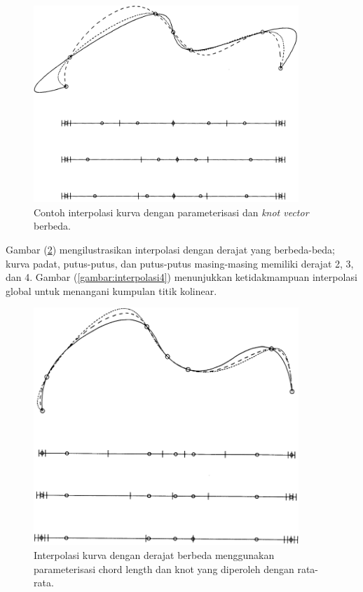 \begin{figure}[H]
	\centering
	\includegraphics[keepaspectratio, width=10cm]{gambar/Interpolasi/pic7.png}
	\caption{Contoh interpolasi kurva dengan 
	parameterisasi dan \textit{knot vector}  berbeda.}
	\label{gambar:interpolasi2}
\end{figure}

Gambar (\ref{gambar:interpolasi3}) mengilustrasikan 
interpolasi dengan derajat yang berbeda-beda; 
kurva padat, putus-putus, dan putus-putus 
masing-masing memiliki derajat 2, 3, dan 4. 
Gambar (\ref{gambar:interpolasi4}) menunjukkan 
ketidakmampuan interpolasi global untuk menangani 
kumpulan titik kolinear.

\begin{figure}[H]
	\centering
	\includegraphics[keepaspectratio, width=10cm]{gambar/Interpolasi/pic8.png}
	\caption{Interpolasi kurva dengan derajat 
	berbeda menggunakan parameterisasi chord 
	length dan knot yang diperoleh dengan rata-rata.}
	\label{gambar:interpolasi3}
\end{figure}

